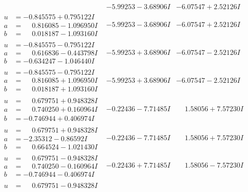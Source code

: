 \documentclass[1p]{elsarticle_modified}
\theoremstyle{definition}
\begin{document}
$$\begin{array}{c|c|c}
 & -5.99253 - 3.68906 I & -6.07547 + 2.52126 I \\ \hline\begin{aligned}
u &= -0.845575 + 0.795122 I \\
a &= \phantom{-}0.816085 - 1.096950 I \\
b &= \phantom{-}0.018187 - 1.093160 I\end{aligned}
 & -5.99253 - 3.68906 I & -6.07547 + 2.52126 I \\ \hline\begin{aligned}
u &= -0.845575 - 0.795122 I \\
a &= \phantom{-}0.616836 - 0.443798 I \\
b &= -0.634247 - 1.046440 I\end{aligned}
 & -5.99253 + 3.68906 I & -6.07547 - 2.52126 I \\ \hline\begin{aligned}
u &= -0.845575 - 0.795122 I \\
a &= \phantom{-}0.816085 + 1.096950 I \\
b &= \phantom{-}0.018187 + 1.093160 I\end{aligned}
 & -5.99253 + 3.68906 I & -6.07547 - 2.52126 I \\ \hline\begin{aligned}
u &= \phantom{-}0.679751 + 0.948328 I \\
a &= \phantom{-}0.740250 + 0.160964 I \\
b &= -0.746944 + 0.406974 I\end{aligned}
 & -0.22436 - 7.71485 I & \phantom{-}1.58056 + 7.57230 I \\ \hline\begin{aligned}
u &= \phantom{-}0.679751 + 0.948328 I \\
a &= -2.35312 - 0.86592 I \\
b &= \phantom{-}0.664524 - 1.021430 I\end{aligned}
 & -0.22436 - 7.71485 I & \phantom{-}1.58056 + 7.57230 I \\ \hline\begin{aligned}
u &= \phantom{-}0.679751 - 0.948328 I \\
a &= \phantom{-}0.740250 - 0.160964 I \\
b &= -0.746944 - 0.406974 I\end{aligned}
 & -0.22436 + 7.71485 I & \phantom{-}1.58056 - 7.57230 I \\ \hline\begin{aligned}
u &= \phantom{-}0.679751 - 0.948328 I \\

\end{aligned}
\end{array}$$
\end{document}
